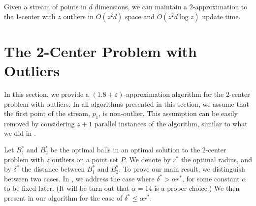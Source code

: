 \documentclass[envcountsame]{cls/cccg15}
\renewcommand{\O}{\ensuremath{{O}}}
\newcommand{\textproc}{\textsc}
\newcommand{\lee}{\leqslant}
\renewcommand{\leq}{\lee}
\newcommand{\eps}{\varepsilon}
\begin{document}
\begin{theorem} \label{thm:1-center-stream}
	Given a stream of points in $d$ dimensions,
	we can maintain a 2-approximation to the 1-center with $z$ outliers
	in $\O(z^2d)$ space and $\O (z^2d\log z)$ update time.
\end{theorem}

%






\section{The 2-Center Problem with Outliers}
\label{sec:2-center}

In this section, we provide a $(1.8 + \eps)$-approximation algorithm
for the 2-center problem with outliers.
In all algorithms presented in this section,
we assume that the first point of the stream, $p_1$, is non-outlier. 
This assumption can be easily removed by considering $z + 1$ parallel instances of the algorithm, 
similar to what we did in .

Let $B_1^*$ and $B_2^*$ be the optimal balls
in an optimal solution to the 2-center problem with $z$ outliers on a point set $P$.
We denote by $r^*$ the optimal radius,
and by $\delta^*$ the distance between $B_1^*$ and $B_2^*$.
To prove our main result, we distinguish between two cases.
In , we address the case where $\delta^* > \alpha r^*$, 
for some constant $\alpha$ to be fixed later.
(It will be turn out that $\alpha = 14$ is a proper choice.)
We then present in  
our algorithm for the case of $\delta^* \leq \alpha r^*$.
\end{document}
